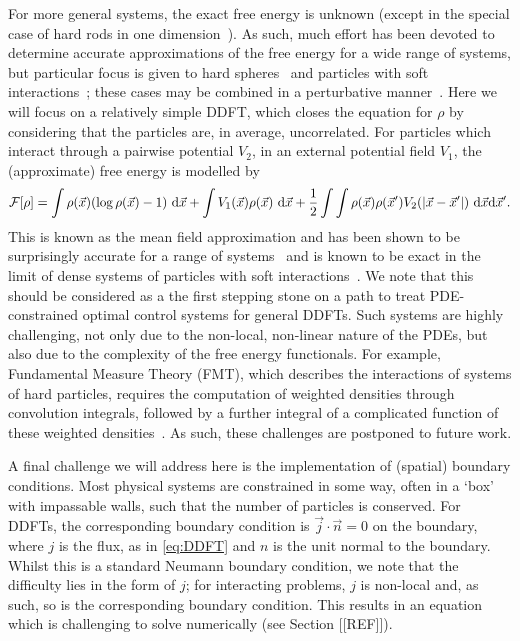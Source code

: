 For more general systems, the exact free energy is unknown (except in the special case of hard rods in one dimension~\cite{TCM08}).
As such, much effort has been devoted to determine accurate approximations of the free energy for a wide range
of systems, but particular focus is given to hard spheres~\cite{R10} and particles with soft interactions~\cite{HM13}; these cases may be
combined in a perturbative manner~\cite{E92}. Here we will focus on a relatively simple DDFT, which closes the equation for 
$\rho$ by considering that the particles are, in average, uncorrelated.  For particles which interact through a pairwise potential $V_2$,
in an external potential field $V_1$, the (approximate) free energy is modelled by
\[
	\mathcal{F}[\rho] = \int \rho(\vec{x})( \log \rho(\vec{x}) -1 )~ {\rm d} \vec{x} + \int V_1(\vec{x}) \rho(\vec{x})~ {\rm d} \vec{x}
	+ \frac{1}{2} \int \int \rho(\vec{x}) \rho(\vec{x}') V_2(|\vec{x} - \vec{x}'|) ~ {\rm d} \vec{x} {\rm d} \vec{x}'.
\]	
This is known as the mean field approximation and has been shown to be surprisingly accurate for a range of systems~\cite{ACE17}
and is known to be exact
in the limit of dense systems of particles with soft interactions~\cite{MS82}.  We note that this should be considered
as a the first stepping stone on a path to treat PDE-constrained optimal control systems for general DDFTs.  Such systems
are highly challenging, not only due to the non-local, non-linear nature of the PDEs, but also due to the complexity of 
the free energy functionals.  For example, Fundamental Measure Theory (FMT), which describes the interactions of
systems of hard particles, requires the computation of weighted densities through convolution integrals, followed by
a further integral of a complicated function of these weighted densities~\cite{R10}.  As such, these challenges are postponed
to future work.

A final challenge we will address here is the implementation of (spatial) boundary conditions.  Most physical systems
are constrained in some way, often in a `box' with impassable walls, such that the number of particles is conserved.  
For DDFTs, the corresponding boundary condition is $\vec{j}\cdot \vec{n}=0$ on the boundary, where $j$ is the flux, as in \eqref{eq:DDFT} and
$n$ is the unit normal to the boundary.  Whilst this is a standard Neumann boundary condition, we note that the 
difficulty lies in the form of $j$; for interacting problems, $j$ is non-local and, as such, so is the corresponding boundary
condition.  This results in an equation which is challenging to solve numerically (see Section [[REF]]).